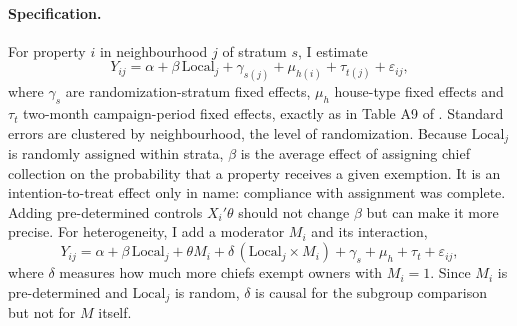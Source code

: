 \documentclass[11pt]{article}
\begin{document}
\paragraph{Specification.} For property $i$ in neighbourhood $j$ of stratum $s$, I estimate
\begin{equation}\label{eq:ate}
Y_{ij} = \alpha + \beta\, \text{Local}_j + \gamma_{s(j)} + \mu_{h(i)} + \tau_{t(j)} + \varepsilon_{ij},
\end{equation}
where $\gamma_s$ are randomization-stratum fixed effects, $\mu_h$ house-type fixed effects and $\tau_t$ two-month campaign-period fixed effects, exactly as in Table A9 of \citet{balan2022}. Standard errors are clustered by neighbourhood, the level of randomization. Because $\text{Local}_j$ is randomly assigned within strata, $\beta$ is the average effect of assigning chief collection on the probability that a property receives a given exemption. It is an intention-to-treat effect only in name: compliance with assignment was complete. Adding pre-determined controls $X_i'\theta$ should not change $\beta$ but can make it more precise. For heterogeneity, I add a moderator $M_i$ and its interaction,
\begin{equation}\label{eq:het}
Y_{ij} = \alpha + \beta\, \text{Local}_j + \theta M_i + \delta\, (\text{Local}_j \times M_i) + \gamma_{s} + \mu_{h} + \tau_{t} + \varepsilon_{ij},
\end{equation}
where $\delta$ measures how much more chiefs exempt owners with $M_i=1$. Since $M_i$ is pre-determined and $\text{Local}_j$ is random, $\delta$ is causal for the subgroup comparison but not for $M$ itself.
\end{document}
